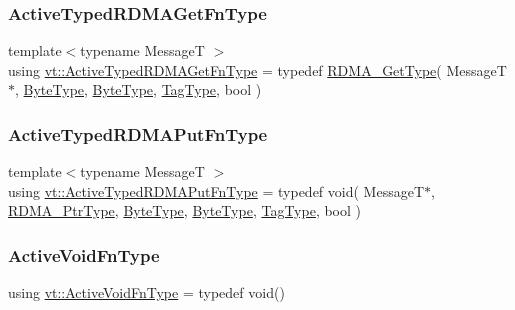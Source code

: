 \mbox{\label{namespacevt_add83fe11410931719f6543a575acfe87}} 
\subsubsection{\texorpdfstring{Active\+Typed\+R\+D\+M\+A\+Get\+Fn\+Type}{ActiveTypedRDMAGetFnType}}
{\footnotesize\ttfamily template$<$typename MessageT $>$ \\
using \hyperlink{namespacevt_add83fe11410931719f6543a575acfe87}{vt\+::\+Active\+Typed\+R\+D\+M\+A\+Get\+Fn\+Type} = typedef \hyperlink{namespacevt_a1cab7f4860f65a49ad2c042d6240f288}{R\+D\+M\+A\+\_\+\+Get\+Type}( MessageT$\ast$, \hyperlink{namespacevt_aab8d55968084610ce3b17057981e9300}{Byte\+Type}, \hyperlink{namespacevt_aab8d55968084610ce3b17057981e9300}{Byte\+Type}, \hyperlink{namespacevt_a84ab281dae04a52a4b243d6bf62d0e52}{Tag\+Type}, bool )}

\mbox{\label{namespacevt_a881ee9bd1e4e71905da1f563ee26ce25}} 
\subsubsection{\texorpdfstring{Active\+Typed\+R\+D\+M\+A\+Put\+Fn\+Type}{ActiveTypedRDMAPutFnType}}
{\footnotesize\ttfamily template$<$typename MessageT $>$ \\
using \hyperlink{namespacevt_a881ee9bd1e4e71905da1f563ee26ce25}{vt\+::\+Active\+Typed\+R\+D\+M\+A\+Put\+Fn\+Type} = typedef void( MessageT$\ast$, \hyperlink{namespacevt_a9e2c953286c7616f7c218e9951790776}{R\+D\+M\+A\+\_\+\+Ptr\+Type}, \hyperlink{namespacevt_aab8d55968084610ce3b17057981e9300}{Byte\+Type}, \hyperlink{namespacevt_aab8d55968084610ce3b17057981e9300}{Byte\+Type}, \hyperlink{namespacevt_a84ab281dae04a52a4b243d6bf62d0e52}{Tag\+Type}, bool )}

\mbox{\label{namespacevt_ad0569ad32e87f0c5fb53fccd669f8dfa}} 
\subsubsection{\texorpdfstring{Active\+Void\+Fn\+Type}{ActiveVoidFnType}}
{\footnotesize\ttfamily using \hyperlink{namespacevt_ad0569ad32e87f0c5fb53fccd669f8dfa}{vt\+::\+Active\+Void\+Fn\+Type} = typedef void()}

